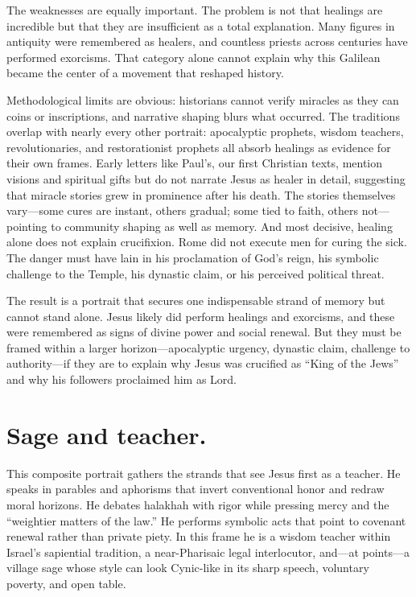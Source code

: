 The weaknesses are equally important.
The problem is not that healings are incredible but that they are insufficient as a total explanation.
Many figures in antiquity were remembered as healers, and countless priests across centuries have performed exorcisms.
That category alone cannot explain why this Galilean became the center of a movement that reshaped history.

Methodological limits are obvious: historians cannot verify miracles as they can coins or inscriptions, and narrative shaping blurs what occurred.
The traditions overlap with nearly every other portrait: apocalyptic prophets, wisdom teachers, revolutionaries, and restorationist prophets all absorb healings as evidence for their own frames.
Early letters like Paul’s, our first Christian texts, mention visions and spiritual gifts but do not narrate Jesus as healer in detail, suggesting that miracle stories grew in prominence after his death.
The stories themselves vary—some cures are instant, others gradual; some tied to faith, others not—pointing to community shaping as well as memory.
And most decisive, healing alone does not explain crucifixion.
Rome did not execute men for curing the sick.
The danger must have lain in his proclamation of God’s reign, his symbolic challenge to the Temple, his dynastic claim, or his perceived political threat.

The result is a portrait that secures one indispensable strand of memory but cannot stand alone.
Jesus likely did perform healings and exorcisms, and these were remembered as signs of divine power and social renewal.
But they must be framed within a larger horizon—apocalyptic urgency, dynastic claim, challenge to authority—if they are to explain why Jesus was crucified as “King of the Jews” and why his followers proclaimed him as Lord.

\section{Sage and teacher.}

This composite portrait gathers the strands that see Jesus first as a teacher.
He speaks in parables and aphorisms that invert conventional honor and redraw moral horizons.
He debates halakhah with rigor while pressing mercy and the “weightier matters of the law.”
He performs symbolic acts that point to covenant renewal rather than private piety.
In this frame he is a wisdom teacher within Israel’s sapiential tradition, a near-Pharisaic legal interlocutor, and—at points—a village sage whose style can look Cynic-like in its sharp speech, voluntary poverty, and open table.

